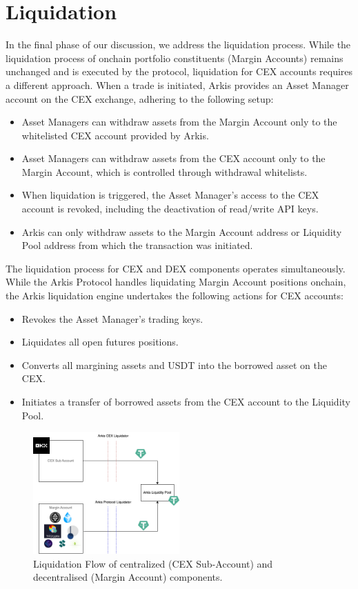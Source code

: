 \documentclass[conference]{IEEEtran}
\begin{document}
\section{Liquidation}

In the final phase of our discussion, we address the liquidation process. While the liquidation process of onchain portfolio constituents (Margin Accounts) remains unchanged and is executed by the protocol, liquidation for CEX accounts requires a different approach. When a trade is initiated, Arkis provides an Asset Manager account on the CEX exchange, adhering to the following setup:
\begin{itemize}
	\item Asset Managers can withdraw assets from the Margin Account only to the whitelisted CEX account provided by Arkis.
	\item Asset Managers can withdraw assets from the CEX account only to the Margin Account, which is controlled through withdrawal whitelists.
	\item When liquidation is triggered, the Asset Manager's access to the CEX account is revoked, including the deactivation of read/write API keys.
	\item Arkis can only withdraw assets to the Margin Account address or Liquidity Pool address from which the transaction was initiated.
\end{itemize}


The liquidation process for CEX and DEX components operates simultaneously. While the Arkis Protocol handles liquidating Margin Account positions onchain, the Arkis liquidation engine undertakes the following actions for CEX accounts:
\begin{itemize}
	\item Revokes the Asset Manager's trading keys.
	\item Liquidates all open futures positions.
	\item Converts all margining assets and USDT into the borrowed asset on the CEX.
	\item Initiates a transfer of borrowed assets from the CEX account to the Liquidity Pool.
\end{itemize}

\begin{figure}[h]
\centering
\includegraphics[width=0.5\textwidth]{images/Arkis_v2_Liquidation.png}
\caption{Liquidation Flow of centralized (CEX Sub-Account) and decentralised (Margin Account) components.}
\end{figure} 
\end{document}
